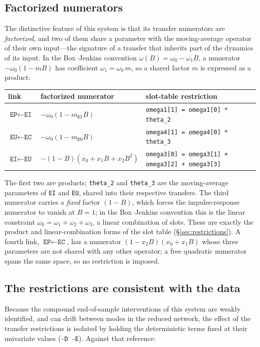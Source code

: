 \documentclass[11pt,a4paper]{article}
\theoremstyle{plain}
\theoremstyle{remark}
\begin{document}
\subsection{Factorized numerators}

The distinctive feature of this system is that its transfer numerators are
\emph{factorized}, and two of them share a parameter with the moving-average
operator of their own input---the signature of a transfer that inherits part of the
dynamics of its input. In the Box--Jenkins convention $\omega(B)=\omega_0-\omega_1B$,
a numerator $-\omega_0(1-mB)$ has coefficient $\omega_1=\omega_0\,m$, so a shared
factor $m$ is expressed as a product:
\begin{center}
\begin{tabular}{lll}
\toprule
link & factorized numerator & slot-table restriction \\
\midrule
$\texttt{EP}\leftarrow\texttt{EI}$ & $-\omega_0(1-m_{\texttt{EI}}B)$
   & \texttt{omega1[1] = omega1[0] * theta\_2} \\
$\texttt{EU}\leftarrow\texttt{EC}$ & $-\omega_0(1-m_{\texttt{EU}}B)$
   & \texttt{omega4[1] = omega4[0] * theta\_3} \\
$\texttt{EI}\leftarrow\texttt{EU}$ & $-(1-B)(x_0+x_1B+x_2B^2)$
   & \texttt{omega3[0] = omega3[1] + omega3[2] + omega3[3]} \\
\bottomrule
\end{tabular}
\end{center}
The first two are products; \texttt{theta\_2} and \texttt{theta\_3} are the
moving-average parameters of \texttt{EI} and \texttt{EU}, shared into their
respective transfers. The third numerator carries a \emph{fixed} factor $(1-B)$,
which forces the impulse-response numerator to vanish at $B=1$; in the Box--Jenkins
convention this is the linear constraint
$\omega_0=\omega_1+\omega_2+\omega_3$, a linear combination of slots. These are
exactly the product and linear-combination forms of the slot table
(\S\ref{sec:restrictions}). A fourth link, $\texttt{EP}\leftarrow\texttt{EC}$, has a
numerator $(1-x_2B)(x_0+x_1B)$ whose three parameters are not shared with any other
operator; a free quadratic numerator spans the same space, so no restriction is
imposed.

\subsection{The restrictions are consistent with the data}

Because the compound end-of-sample interventions of this system are weakly
identified, and can drift between modes in the reduced network, the effect of the
transfer restrictions is isolated by holding the deterministic terms fixed at their
univariate values (\texttt{-D -E}). Against that reference:
\end{document}
